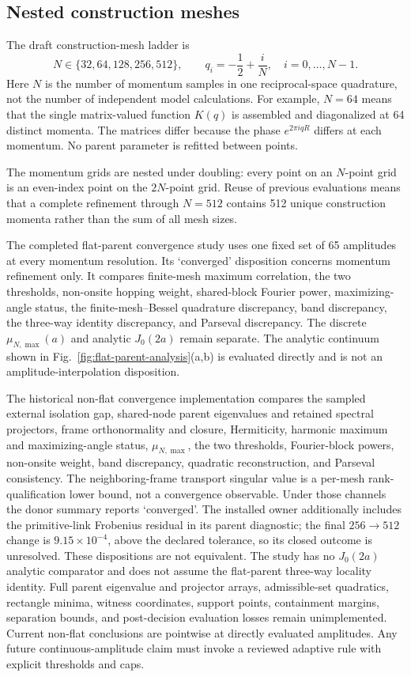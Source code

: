 \documentclass[11pt]{article}
\begin{document}
\subsection{Nested construction meshes}

The draft construction-mesh ladder is
\begin{equation}
 N\in\{32,64,128,256,512\},
 \qquad
 q_i=-\frac12+\frac{i}{N},
 \quad i=0,\ldots,N-1.
 \label{eq:construction-meshes}
\end{equation}
Here $N$ is the number of momentum samples in one reciprocal-space quadrature, not the
number of independent model calculations. For example, $N=64$ means that the single
matrix-valued function $K(q)$ is assembled and diagonalized at 64 distinct momenta. The
matrices differ because the phase $e^{2\pi iqR}$ differs at each momentum. No parent
parameter is refitted between points.

The momentum grids are nested under doubling: every point on an $N$-point grid is an
even-index point on the $2N$-point grid. Reuse of previous evaluations means that a
complete refinement through $N=512$ contains 512 unique construction momenta rather than
the sum of all mesh sizes.

The completed flat-parent convergence study uses one fixed set of 65 amplitudes at every
momentum resolution. Its `converged' disposition concerns momentum refinement only. It
compares finite-mesh maximum correlation, the two thresholds, non-onsite hopping weight,
shared-block Fourier power, maximizing-angle status, the finite-mesh--Bessel quadrature
discrepancy, band discrepancy, the three-way identity discrepancy, and Parseval discrepancy. The discrete
$\mu_{N,\max}(a)$ and analytic $J_0(2a)$ remain separate. The analytic continuum shown
in Fig.~\ref{fig:flat-parent-analysis}(a,b) is evaluated directly and is not an
amplitude-interpolation disposition.

The historical non-flat convergence implementation compares the sampled external
isolation gap, shared-node parent eigenvalues and retained spectral projectors, frame
orthonormality and closure, Hermiticity, harmonic maximum and maximizing-angle status,
$\mu_{N,\max}$, the two thresholds, Fourier-block powers, non-onsite weight, band
discrepancy, quadratic reconstruction, and Parseval consistency. The neighboring-frame
transport singular value is a per-mesh rank-qualification lower bound, not a convergence
observable. Under those channels the donor summary reports `converged'. The installed
owner additionally includes the primitive-link Frobenius residual in its parent
diagnostic; the final $256\rightarrow512$ change is $9.15\times10^{-4}$, above the
declared tolerance, so its closed outcome is unresolved. These dispositions are not
equivalent. The study has no $J_0(2a)$ analytic comparator and does not assume the
flat-parent three-way locality identity. Full parent eigenvalue and projector arrays, admissible-set
quadratics, rectangle minima, witness coordinates,
support points, containment margins, separation bounds, and post-decision evaluation
losses remain unimplemented. Current non-flat conclusions are pointwise at directly
evaluated amplitudes. Any future continuous-amplitude claim must invoke a reviewed
adaptive rule with explicit thresholds and caps.
\end{document}
